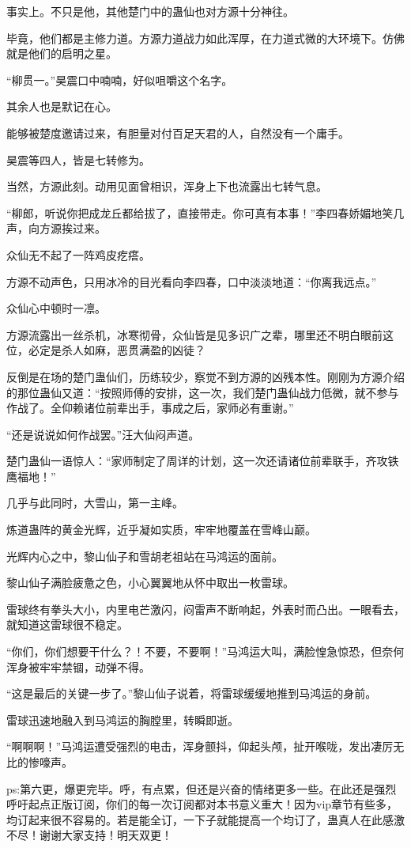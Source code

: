 \begin{this_body}
事实上。不只是他，其他楚门中的蛊仙也对方源十分神往。

毕竟，他们都是主修力道。方源力道战力如此浑厚，在力道式微的大环境下。仿佛就是他们的启明之星。

“柳贯一。”昊震口中喃喃，好似咀嚼这个名字。

其余人也是默记在心。

能够被楚度邀请过来，有胆量对付百足天君的人，自然没有一个庸手。

昊震等四人，皆是七转修为。

当然，方源此刻。动用见面曾相识，浑身上下也流露出七转气息。

“柳郎，听说你把成龙丘都给拔了，直接带走。你可真有本事！”李四春娇媚地笑几声，向方源挨过来。

众仙无不起了一阵鸡皮疙瘩。

方源不动声色，只用冰冷的目光看向李四春，口中淡淡地道：“你离我远点。”

众仙心中顿时一凛。

方源流露出一丝杀机，冰寒彻骨，众仙皆是见多识广之辈，哪里还不明白眼前这位，必定是杀人如麻，恶贯满盈的凶徒？

反倒是在场的楚门蛊仙们，历练较少，察觉不到方源的凶残本性。刚刚为方源介绍的那位蛊仙又道：“按照师傅的安排，这一次，我们楚门蛊仙战力低微，就不参与作战了。全仰赖诸位前辈出手，事成之后，家师必有重谢。”

“还是说说如何作战罢。”汪大仙闷声道。

楚门蛊仙一语惊人：“家师制定了周详的计划，这一次还请诸位前辈联手，齐攻铁鹰福地！”

几乎与此同时，大雪山，第一主峰。

炼道蛊阵的黄金光辉，近乎凝如实质，牢牢地覆盖在雪峰山巅。

光辉内心之中，黎山仙子和雪胡老祖站在马鸿运的面前。

黎山仙子满脸疲惫之色，小心翼翼地从怀中取出一枚雷球。

雷球终有拳头大小，内里电芒激闪，闷雷声不断响起，外表时而凸出。一眼看去，就知道这雷球很不稳定。

“你们，你们想要干什么？！不要，不要啊！”马鸿运大叫，满脸惶急惊恐，但奈何浑身被牢牢禁锢，动弹不得。

“这是最后的关键一步了。”黎山仙子说着，将雷球缓缓地推到马鸿运的身前。

雷球迅速地融入到马鸿运的胸膛里，转瞬即逝。

“啊啊啊！”马鸿运遭受强烈的电击，浑身颤抖，仰起头颅，扯开喉咙，发出凄厉无比的惨嚎声。

ps:第六更，爆更完毕。呼，有点累，但还是兴奋的情绪更多一些。在此还是强烈呼吁起点正版订阅，你们的每一次订阅都对本书意义重大！因为vip章节有些多，均订起来很不容易的。若是能全订，一下子就能提高一个均订了，蛊真人在此感激不尽！谢谢大家支持！明天双更！

\end{this_body}

